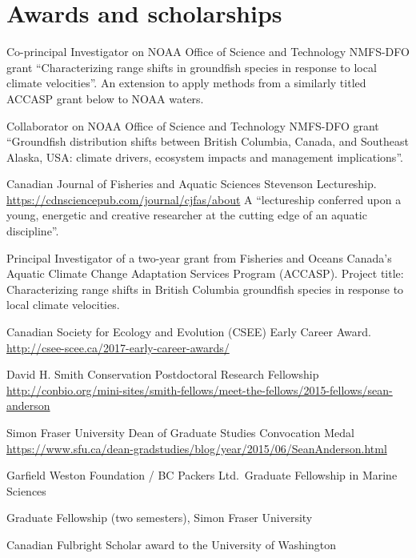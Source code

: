\section{Awards and scholarships}\label{awards-and-scholarships}

\begin{description}
\tightlist
\item[2020--21]
Co-principal Investigator on NOAA Office of Science and Technology
NMFS-DFO grant ``Characterizing range shifts in groundfish species in
response to local climate velocities''. An extension to apply methods
from a similarly titled ACCASP grant below to NOAA waters.
\item[2020--21]
Collaborator on NOAA Office of Science and Technology NMFS-DFO grant
``Groundfish distribution shifts between British Columbia, Canada, and
Southeast Alaska, USA: climate drivers, ecosystem impacts and management
implications''.
\item[2019]
Canadian Journal of Fisheries and Aquatic Sciences Stevenson
Lectureship. \url{https://cdnsciencepub.com/journal/cjfas/about} A
``lectureship conferred upon a young, energetic and creative researcher
at the cutting edge of an aquatic discipline''.
\item[2018--20]
Principal Investigator of a two-year grant from Fisheries and Oceans
Canada's Aquatic Climate Change Adaptation Services Program (ACCASP).
Project title: Characterizing range shifts in British Columbia
groundfish species in response to local climate velocities.
\item[2017]
Canadian Society for Ecology and Evolution (CSEE) Early Career Award.\\
\url{http://csee-scee.ca/2017-early-career-awards/}
\item[2015]
David H. Smith Conservation Postdoctoral Research Fellowship\\
\url{http://conbio.org/mini-sites/smith-fellows/meet-the-fellows/2015-fellows/sean-anderson}
\item[2015]
Simon Fraser University Dean of Graduate Studies Convocation Medal\\
\url{https://www.sfu.ca/dean-gradstudies/blog/year/2015/06/SeanAnderson.html}
\item[2014]
Garfield Weston Foundation / BC Packers Ltd.\ Graduate Fellowship in
Marine Sciences
\item[2014]
Graduate Fellowship (two semesters), Simon Fraser University
\item[2012--13]
Canadian Fulbright Scholar award to the University of Washington

\end{description}
